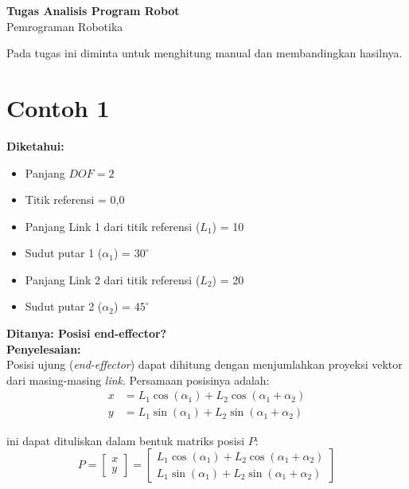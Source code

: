 \documentclass[12pt, a4paper, bahasa]{article}
\begin{document}
\begin{center}
    \large \textbf{Tugas Analisis Program Robot} \\[0.2cm]
    \large Pemrograman Robotika  \\[0.5cm]
\end{center}

Pada tugas ini diminta untuk menghitung manual dan membandingkan hasilnya.

\section*{Contoh 1}
\textbf{Diketahui:}
\begin{itemize}
    \item Panjang $DOF = 2$
    \item Titik referensi = 0,0
    \item Panjang Link 1 dari titik referensi ($L_1$) = 10
    \item Sudut putar 1 ($\alpha_1$) = $30^\circ$
    \item Panjang Link 2 dari titik referensi ($L_2$) = 20
    \item Sudut putar 2 ($\alpha_2$) = $45^\circ$
\end{itemize}

\noindent \textbf{Ditanya: Posisi end-effector?}
\vspace{0.5cm} \\
\noindent \textbf{Penyelesaian:} \\
Posisi ujung (\textit{end-effector}) dapat dihitung dengan menjumlahkan proyeksi vektor dari masing-masing \textit{link}. Persamaan posisinya adalah:
\begin{align*}
    x & = L_1 \cos(\alpha_1) + L_2 \cos(\alpha_1 + \alpha_2) \\
    y & = L_1 \sin(\alpha_1) + L_2 \sin(\alpha_1 + \alpha_2)
\end{align*}

ini dapat dituliskan dalam bentuk matriks posisi $P$:
\begin{equation}
    P = \begin{bmatrix} x \\ y \end{bmatrix} =
    \begin{bmatrix}
        L_1 \cos(\alpha_1) + L_2 \cos(\alpha_1 + \alpha_2) \\
        L_1 \sin(\alpha_1) + L_2 \sin(\alpha_1 + \alpha_2)
    \end{bmatrix}
\end{equation}
\end{document}
